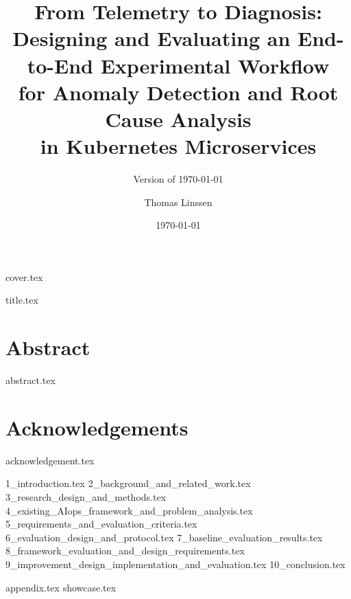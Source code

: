 \documentclass[oneside,openany]{mscthesis}
\title{\LARGE From Telemetry to Diagnosis:\\[0.3em]Designing and Evaluating an End-to-End Experimental Workflow\\for Anomaly Detection and Root Cause Analysis\\in Kubernetes Microservices} \AtBeginDocument{\hypersetup{pdftitle={From Telemetry to Diagnosis: Designing and Evaluating an End-to-End Experimental Workflow for Anomaly Detection and Root Cause Analysis in Kubernetes Microservices}}}
\subtitle{Version of \today}
\date{\today}
\author{Thomas Linssen}
\begin{document}
%
%

\frontmatter
{cover.tex}

\cleartorecto{}
{title.tex}


\cleartorecto{}
\chapter{Abstract}
{abstract.tex}
\glsresetall{}

\cleartorecto{}
\tableofcontents{}
\clearpage{}

\listoffigures{}
\clearpage{}

\listoftables{}
\clearpage{}

\cleartorecto{}
\chapter{Acknowledgements}
{acknowledgement.tex}


\mainmatter

{1_introduction.tex}
{2_background_and_related_work.tex}
{3_research_design_and_methods.tex}
{4_existing_AIops_framework_and_problem_analysis.tex}
{5_requirements_and_evaluation_criteria.tex}
{6_evaluation_design_and_protocol.tex}
{7_baseline_evaluation_results.tex}
{8_framework_evaluation_and_design_requirements.tex}
{9_improvement_design_implementation_and_evaluation.tex}
{10_conclusion.tex}

%
%

\appendix

{appendix.tex}
{showcase.tex}

%
%

\backmatter

\printbibliography{}
\cleardoublepage{}

\printacronyms[style=long,title={Acronyms}]
\cleardoublepage{}

\end{document}
